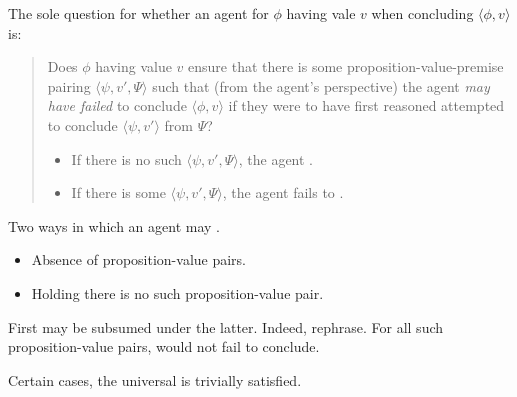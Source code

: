 \begin{note}
  The sole question for whether an agent \csV{} for \(\phi\) having vale \(v\) when concluding \(\langle \phi, v \rangle\) is:
  \begin{quote}
    Does \(\phi\) having value \(v\) ensure that there is some proposition-value-premise pairing \(\langle \psi,v',\Psi \rangle\) such that (from the agent's perspective) the agent \emph{may have failed} to conclude \(\langle \phi,v \rangle\) if they were to have first reasoned attempted to conclude \(\langle \psi,v' \rangle\) from \(\Psi\)?
    \begin{itemize}
    \item If there is no such \(\langle \psi,v',\Psi \rangle\), the agent \csV{}.
    \item If there is some \(\langle \psi,v',\Psi \rangle\), the agent fails to \csV{}.
    \end{itemize}
  \end{quote}
\end{note}

\begin{note}
  Two ways in which an agent may \csN{}.
  \begin{itemize}
  \item
    Absence of proposition-value pairs.
  \item
    Holding there is no such proposition-value pair.
  \end{itemize}
  First may be subsumed under the latter.
  Indeed, rephrase.
  For all such proposition-value pairs, would not fail to conclude.

  Certain cases, the universal is trivially satisfied.
\end{note}

